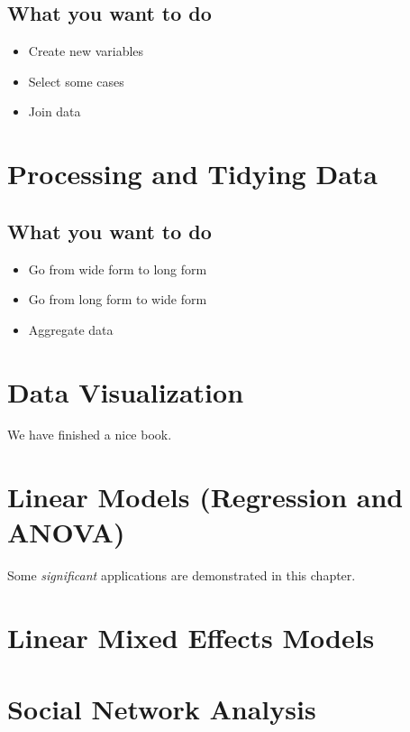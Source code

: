 \documentclass[]{book}
\providecommand{\tightlist}{%
  \setlength{\itemsep}{0pt}\setlength{\parskip}{0pt}}
\theoremstyle{definition}
\theoremstyle{definition}
\theoremstyle{remark}
\begin{document}
\section{What you want to do}\label{what-you-want-to-do}

\begin{itemize}
\tightlist
\item
  Create new variables
\item
  Select some cases
\item
  Join data
\end{itemize}

\chapter{Processing and Tidying
Data}\label{processing-and-tidying-data-1}

\section{What you want to do}\label{what-you-want-to-do-1}

\begin{itemize}
\tightlist
\item
  Go from wide form to long form
\item
  Go from long form to wide form
\item
  Aggregate data
\end{itemize}

\chapter{Data Visualization}\label{data-visualization}

We have finished a nice book.

\chapter{Linear Models (Regression and
ANOVA)}\label{linear-models-regression-and-anova}

Some \emph{significant} applications are demonstrated in this chapter.

\chapter{Linear Mixed Effects Models}\label{linear-mixed-effects-models}

\chapter{Social Network Analysis}\label{social-network-analysis}
\end{document}

